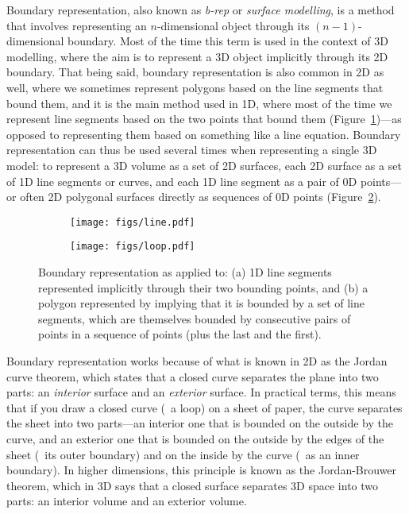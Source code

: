 Boundary representation, also known as \emph{b-rep} or \emph{surface modelling}, is a method that involves representing an \(n\)-dimensional object through its \((n-1)\)-dimensional boundary.
Most of the time this term is used in the context of 3D modelling, where the aim is to represent a 3D object implicitly through its 2D boundary.
That being said, boundary representation is also common in 2D as well, where we sometimes represent polygons based on the line segments that bound them, and it is the main method used in 1D, where most of the time we represent line segments based on the two points that bound them (Figure~\ref{subfig:line})---as opposed to representing them based on something like a line equation.
Boundary representation can thus be used several times when representing a single 3D model: to represent a 3D volume as a set of 2D surfaces, each 2D surface as a set of 1D line segments or curves, and each 1D line segment as a pair of 0D points---or often 2D polygonal surfaces directly as sequences of 0D points (Figure~\ref{subfig:loop}).

\begin{figure}
\centering
\begin{subfigure}[b]{0.2\linewidth}
\texttt{[image: figs/line.pdf]}
\caption{}%
\label{subfig:line}
\end{subfigure}
\quad
\begin{subfigure}[b]{0.3\linewidth}
\texttt{[image: figs/loop.pdf]}
\caption{}%
\label{subfig:loop}
\end{subfigure}
\caption{Boundary representation as applied to: (a) 1D line segments represented implicitly through their two bounding points, and (b) a polygon represented by implying that it is bounded by a set of line segments, which are themselves bounded by consecutive pairs of points in a sequence of points (plus the last and the first).}%
\label{fig:brep}
\end{figure}

Boundary representation works because of what is known in 2D as the Jordan curve theorem, which states that a closed curve separates the plane into two parts: an \emph{interior} surface and an \emph{exterior} surface.
In practical terms, this means that if you draw a closed curve (\ie\ a loop) on a sheet of paper, the curve separates the sheet into two parts---an interior one that is bounded on the outside by the curve, and an exterior one that is bounded on the outside by the edges of the sheet (\ie\ its outer boundary) and on the inside by the curve (\ie\ as an inner boundary).
In higher dimensions, this principle is known as the Jordan-Brouwer theorem, which in 3D says that a closed surface separates 3D space into two parts: an interior volume and an exterior volume.

